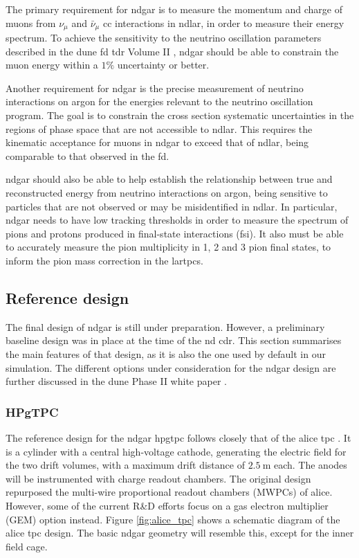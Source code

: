 The primary requirement for \gls{ndgar} is to measure the momentum and charge of muons from $\nu_{\mu}$ and $\bar{\nu}_{\mu}$ \gls{cc} interactions in \gls{ndlar}, in order to measure their energy spectrum. To achieve the sensitivity to the neutrino oscillation parameters described in the \gls{dune} \gls{fd} \gls{tdr} Volume II \cite{DUNE2020TDR2}, \gls{ndgar} should be able to constrain the muon energy within a $1\%$ uncertainty or better.

Another requirement for \gls{ndgar} is the precise measurement of neutrino interactions on argon for the energies relevant to the neutrino oscillation program. The goal is to constrain the cross section systematic uncertainties in the regions of phase space that are not accessible to \gls{ndlar}. This requires the kinematic acceptance for muons in \gls{ndgar} to exceed that of \gls{ndlar}, being comparable to that observed in the \gls{fd}.

\gls{ndgar} should also be able to help establish the relationship between true and reconstructed energy from neutrino interactions on argon, being sensitive to particles that are not observed or may be misidentified in \gls{ndlar}. In particular, \gls{ndgar} needs to have low tracking thresholds in order to measure the spectrum of pions and protons produced in final-state interactions (\gls{fsi}). It also must be able to accurately measure the pion multiplicity in 1, 2 and 3 pion final states, to inform the pion mass correction in the \gls{lartpc}s.

\subsection{Reference design}\label{subsec:ndgar_design}

The final design of \gls{ndgar} is still under preparation. However, a preliminary baseline design was in place at the time of the \gls{nd} \gls{cdr}. This section summarises the main features of that design, as it is also the one used by default in our simulation. The different options under consideration for the \gls{ndgar} design are further discussed in the \gls{dune} Phase II white paper \cite{DUNE2024Phase2}.

\subsubsection{HPgTPC}

The reference design for the \gls{ndgar} \gls{hpgtpc} follows closely that of the \gls{alice} \gls{tpc} \cite{ALICE2006}. It is a cylinder with a central high-voltage cathode, generating the electric field for the two drift volumes, with a maximum drift distance of $2.5~\mathrm{m}$ each. The anodes will be instrumented with charge readout chambers. The original design repurposed the multi-wire proportional readout chambers (MWPCs) of \gls{alice}. However, some of the current R\&D efforts focus on a gas electron multiplier (GEM) \cite{Sauli1997} option instead. Figure \ref{fig:alice_tpc} shows a schematic diagram of the \gls{alice} \gls{tpc} design. The basic \gls{ndgar} geometry will resemble this, except for the inner field cage.

